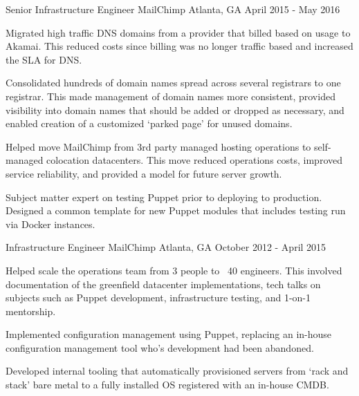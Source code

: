 \begin{cventries}
  \cventry
    {Senior Infrastructure Engineer} %
    {MailChimp} %
    {Atlanta, GA} %
    {April 2015 - May 2016} %
    {
      \begin{cvitems} %
        \item {Migrated high traffic DNS domains from a provider that billed based on usage to Akamai. This reduced costs since billing was no longer traffic based and increased the SLA for DNS.}
        \item {Consolidated hundreds of domain names spread across several registrars to one registrar. This made management of domain names more consistent, provided visibility into domain names that should be added or dropped as necessary, and enabled creation of a customized `parked page' for unused domains.}
        \item {Helped move MailChimp from 3rd party managed hosting operations to self-managed colocation datacenters. This move reduced operations costs, improved service reliability, and provided a model for future server growth.}
        \item {Subject matter expert on testing Puppet prior to deploying to production. Designed a common template for new Puppet modules that includes testing run via Docker instances.}
      \end{cvitems}
    }

  \cventry
    {Infrastructure Engineer} %
    {MailChimp} %
    {Atlanta, GA} %
    {October 2012 - April 2015} %
    {
      \begin{cvitems} %
        \item {Helped scale the operations team from 3 people to ~40 engineers. This involved documentation of the greenfield datacenter implementations, tech talks on subjects such as Puppet development, infrastructure testing, and 1-on-1 mentorship.}
        \item {Implemented configuration management using Puppet, replacing an in-house configuration management tool who's development had been abandoned.}
        \item {Developed internal tooling that automatically provisioned servers from `rack and stack' bare metal to a fully installed OS registered with an in-house CMDB.}
      \end{cvitems}
    }


\end{cventries}
